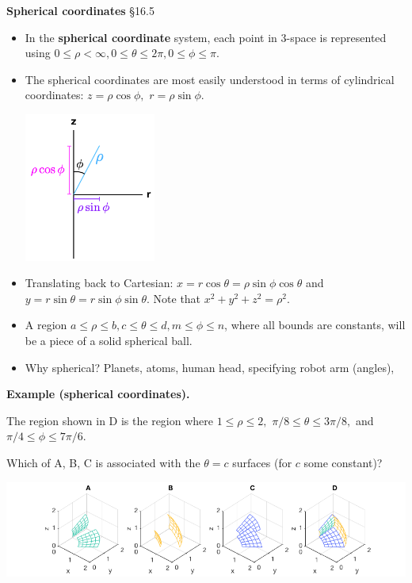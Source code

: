 \documentclass[12pt,letterpaper,noanswers]{exam}
\begin{document}
\noindent\textbf{Spherical coordinates} \S 16.5
\begin{tcolorbox}
\begin{itemize}
\itemsep0em
    \item In the \textbf{spherical coordinate} system, each point in $3$-space is represented using $0\leq \rho < \infty, 0\leq \theta\leq 2\pi, 0 \leq \phi\leq \pi.$  
    \item The spherical coordinates are most easily understood in terms of cylindrical coordinates: $z = \rho\cos\phi,$ $r = \rho\sin\phi$.
    
    \includegraphics[width=1.7in]{img/C13spherical.png}
    
    \item Translating back to Cartesian: $x = r\cos\theta = \rho\sin\phi\cos\theta$ and $y = r\sin\theta = r\sin\phi\sin\theta$.  Note that $x^2+y^2 +z^2= \rho^2.$
    \item A region $a\leq \rho\leq b, c\leq \theta\leq d, m\leq \phi \leq n$, where all bounds are constants, will be a piece of a solid spherical ball.
    \item Why spherical?  Planets, atoms, human head, specifying robot arm (angles), 
    \end{itemize}
    \end{tcolorbox}
    
    \noindent\textbf{Example (spherical coordinates).}

The region shown in D is the region where $1\leq \rho \leq 2,$  $\pi/8\leq \theta\leq 3\pi/8,$ and $ \pi/4\leq \phi \leq 7\pi/6.$

Which of A, B, C is associated with the $\theta = c$ surfaces (for $c$ some constant)? 

\includegraphics[width=0.9\linewidth]{img/C20p5.png}
\end{document}
